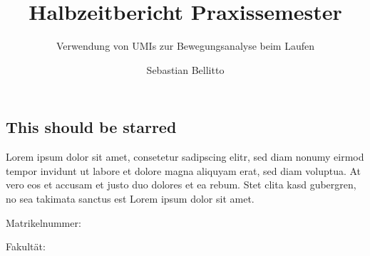 \documentclass[a4paper,12pt]{report}
\author{Sebastian Bellitto}
\title{Halbzeitbericht Praxissemester}
\subtitle{Verwendung von UMIs zur Bewegungsanalyse beim Laufen}
\begin{document}
\setlength{\parindent}{0pt}
\setlength{\parskip}{1.2ex plus 0.5ex minus 0.2ex}

\hstitlepage

\begin{frontmatter}
\chapter*{This should be starred}
Lorem ipsum dolor sit amet, consetetur sadipscing elitr, sed diam nonumy eirmod tempor invidunt ut labore et dolore magna aliquyam erat, sed diam voluptua. At vero eos et accusam et justo duo dolores et ea rebum. Stet clita kasd gubergren, no sea takimata sanctus est Lorem ipsum dolor sit amet.

Matrikelnummer: \givenmatrikelnr

Fakult\"at: \givenfaculty

\tableofcontents
\end{frontmatter}


\listoffigures
\printbibliography[heading=bibintoc, title={Literatur}]
\printindex
\end{document}
